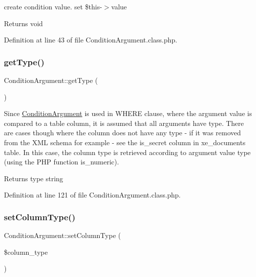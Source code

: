 create condition value. set \$this-\/$>$value \begin{DoxyReturn}{Returns}
void 
\end{DoxyReturn}


Definition at line 43 of file Condition\+Argument.\+class.\+php.

\mbox{\label{classConditionArgument_a39922137cc67e751a5577850bce3cac7}} 
\subsubsection{\texorpdfstring{get\+Type()}{getType()}}
{\footnotesize\ttfamily Condition\+Argument\+::get\+Type (\begin{DoxyParamCaption}{ }\end{DoxyParamCaption})}

Since \hyperlink{classConditionArgument}{Condition\+Argument} is used in W\+H\+E\+RE clause, where the argument value is compared to a table column, it is assumed that all arguments have type. There are cases though where the column does not have any type -\/ if it was removed from the X\+ML schema for example -\/ see the is\+\_\+secret column in xe\+\_\+documents table. In this case, the column type is retrieved according to argument value type (using the P\+HP function is\+\_\+numeric).

\begin{DoxyReturn}{Returns}
type string 
\end{DoxyReturn}


Definition at line 121 of file Condition\+Argument.\+class.\+php.

\mbox{\label{classConditionArgument_a7ee8444a1bfa4763458a006e0fd6ef1e}} 
\subsubsection{\texorpdfstring{set\+Column\+Type()}{setColumnType()}}
{\footnotesize\ttfamily Condition\+Argument\+::set\+Column\+Type (\begin{DoxyParamCaption}\item[{}]{\$column\+\_\+type }\end{DoxyParamCaption})}




